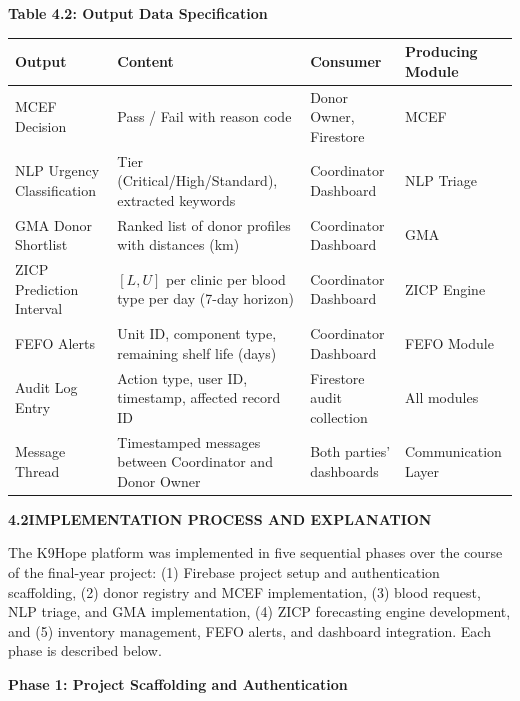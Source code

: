 \documentclass[12pt,a4paper]{article}
\begin{document}
\begin{center}
\textbf{Table 4.2: Output Data Specification}
\vspace{0.4em}
\begin{tabular}{p{3.5cm} p{4.2cm} p{2.5cm} p{3cm}}
\toprule
\textbf{Output} & \textbf{Content} & \textbf{Consumer} & \textbf{Producing Module} \\
\midrule
MCEF Decision & Pass / Fail with reason code & Donor Owner, Firestore & MCEF \\
\addlinespace
NLP Urgency Classification & Tier (Critical/High/Standard), extracted keywords & Coordinator Dashboard & NLP Triage \\
\addlinespace
GMA Donor Shortlist & Ranked list of donor profiles with distances (km) & Coordinator Dashboard & GMA \\
\addlinespace
ZICP Prediction Interval & $[L, U]$ per clinic per blood type per day (7-day horizon) & Coordinator Dashboard & ZICP Engine \\
\addlinespace
FEFO Alerts & Unit ID, component type, remaining shelf life (days) & Coordinator Dashboard & FEFO Module \\
\addlinespace
Audit Log Entry & Action type, user ID, timestamp, affected record ID & Firestore audit collection & All modules \\
\addlinespace
Message Thread & Timestamped messages between Coordinator and Donor Owner & Both parties' dashboards & Communication Layer \\
\bottomrule
\end{tabular}
\end{center}

\vspace{2em}
\noindent\textbf{4.2\quad IMPLEMENTATION PROCESS AND EXPLANATION}
\vspace{0.8em}

\noindent The K9Hope platform was implemented in five sequential phases over the course of the final-year project: (1) Firebase project setup and authentication scaffolding, (2) donor registry and MCEF implementation, (3) blood request, NLP triage, and GMA implementation, (4) ZICP forecasting engine development, and (5) inventory management, FEFO alerts, and dashboard integration. Each phase is described below.

\noindent\textbf{Phase 1: Project Scaffolding and Authentication}
\vspace{0.5em}
\end{document}
